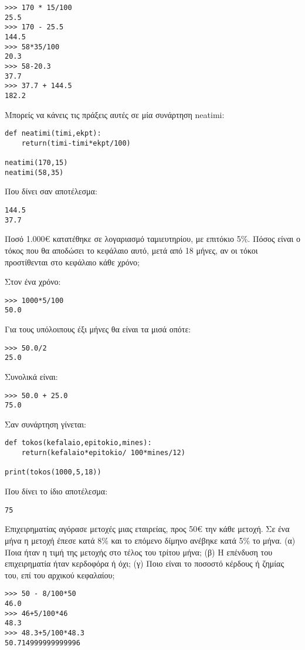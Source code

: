 \begin{lstlisting}
>>> 170 * 15/100
25.5
>>> 170 - 25.5
144.5
>>> 58*35/100
20.3
>>> 58-20.3
37.7
>>> 37.7 + 144.5
182.2
\end{lstlisting}
Μπορείς να κάνεις τις πράξεις αυτές σε μία συνάρτηση neatimi:
\begin{lstlisting}
def neatimi(timi,ekpt):
    return(timi-timi*ekpt/100)

neatimi(170,15)
neatimi(58,35)
\end{lstlisting}
Που δίνει σαν αποτέλεσμα:
\begin{lstlisting}
144.5
37.7
\end{lstlisting}
\begin{exercise}
Ποσό 1.000€ κατατέθηκε σε λογαριασμό ταμιευτηρίου, με επιτόκιο 5\%. Πόσος είναι
ο τόκος που θα αποδώσει το κεφάλαιο αυτό, μετά από 18 μήνες, αν οι τόκοι
προστίθενται στο κεφάλαιο κάθε χρόνο;
\end{exercise}
Στον ένα χρόνο:
\begin{lstlisting}
>>> 1000*5/100
50.0
\end{lstlisting}
Για τους υπόλοιπους έξι μήνες θα είναι τα μισά οπότε:
\begin{lstlisting}
>>> 50.0/2
25.0
\end{lstlisting}
Συνολικά είναι:
\begin{lstlisting}
>>> 50.0 + 25.0
75.0
\end{lstlisting}
Σαν συνάρτηση γίνεται:
\begin{lstlisting}
def tokos(kefalaio,epitokio,mines):
    return(kefalaio*epitokio/ 100*mines/12)

print(tokos(1000,5,18))
\end{lstlisting}
Που δίνει το ίδιο αποτέλεσμα:
\begin{lstlisting}
75
\end{lstlisting}
\begin{exercise}
Επιχειρηματίας αγόρασε μετοχές μιας εταιρείας, προς 50€ την κάθε μετοχή. Σε ένα
μήνα η μετοχή έπεσε κατά 8\% και το επόμενο δίμηνο ανέβηκε κατά 5\% το μήνα.
(α) Ποια ήταν η τιμή της μετοχής στο τέλος του τρίτου μήνα; (β) Η επένδυση του
επιχειρηματία ήταν κερδοφόρα ή όχι; (γ) Ποιο είναι το ποσοστό κέρδους ή ζημίας του,
επί του αρχικού κεφαλαίου;
\end{exercise}
\begin{lstlisting}
>>> 50 - 8/100*50
46.0
>>> 46+5/100*46
48.3
>>> 48.3+5/100*48.3
50.714999999999996
\end{lstlisting}

